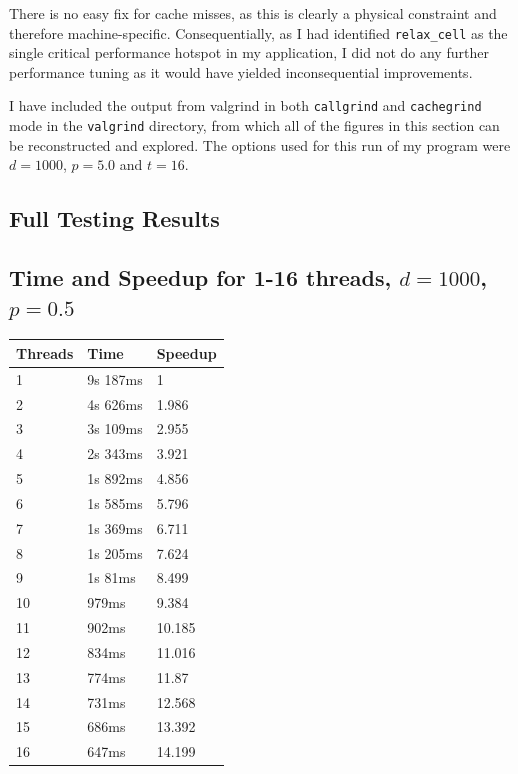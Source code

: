 \documentclass[12pt]{article}
\begin{document}
There is no easy fix for cache misses, as this is clearly a physical constraint and therefore machine-specific. Consequentially, as I had identified \texttt{relax\_cell} as the single critical performance hotspot in my application, I did not do any further performance tuning as it would have yielded inconsequential improvements.

I have included the output from valgrind in both \texttt{callgrind} and \texttt{cachegrind} mode in the \texttt{valgrind} directory, from which all of the figures in this section can be reconstructed and explored. The options used for this run of my program were $d=1000$, $p=5.0$ and $t=16$.


\clearpage




\begin{appendices}

\clearpage
\section{Full Testing Results}
\subsection{Time and Speedup for 1-16 threads, $d=1000$, $p=0.5$}
\footnotesize{\label{sec:basic}
\begin{center}
\begin{tabular}{|l|l|l|}
\hline
Threads	& Time & Speedup  \\
\hline
1 & 9s 187ms & 1 \\
2 & 4s 626ms & 1.986 \\
3 & 3s 109ms & 2.955 \\
4 & 2s 343ms & 3.921 \\
5 & 1s 892ms & 4.856 \\
6 & 1s 585ms & 5.796 \\
7 & 1s 369ms & 6.711 \\
8 & 1s 205ms & 7.624 \\
9 & 1s 81ms & 8.499 \\
10 & 979ms & 9.384 \\
11 & 902ms & 10.185 \\
12 & 834ms & 11.016 \\
13 & 774ms & 11.87 \\
14 & 731ms & 12.568 \\
15 & 686ms & 13.392 \\
16 & 647ms & 14.199 \\
\hline
\end{tabular}
\end{center}}


\end{appendices}
\end{document}
